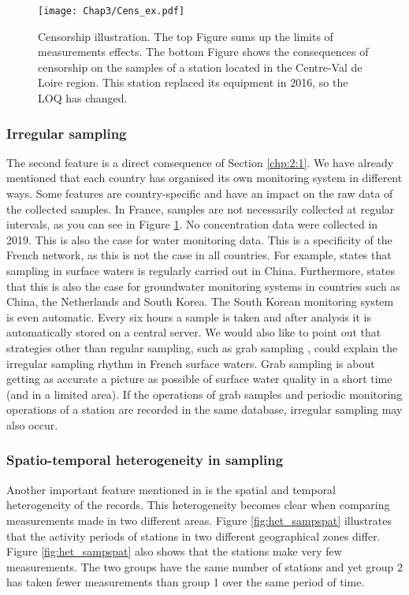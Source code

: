 \begin{figure}
    \centering
    \texttt{[image: Chap3/Cens\_ex.pdf]}
    \caption{Censorship illustration. The top Figure sums up the limits of measurements effects. The bottom Figure shows the consequences of censorship on the samples of a station located in the Centre-Val de Loire region. This station replaced its equipment in 2016, so the LOQ has changed.}
    \label{fig:cens_ex}
\end{figure}

\subsubsection{Irregular sampling}

The second feature is a direct consequence of Section \ref{chp:2:1}. We have already mentioned that each country has organised its own monitoring system in different ways. Some features are country-specific and have an impact on the raw data of the collected samples. In France, samples are not necessarily collected at regular intervals, as you can see in Figure \ref{fig:cens_ex}. No concentration data were collected in 2019. This is also the case for water monitoring data. This is a specificity of the French network, as this is not the case in all countries. For example, \cite{Zhang2008} states that sampling in surface waters is regularly carried out in China. Furthermore, \cite{Joergensen2008} states that this is also the case for groundwater monitoring systems in countries such as China, the Netherlands and South Korea. The South Korean monitoring system is even automatic. Every six hours a sample is taken and after analysis it is automatically stored on a central server. We would also like to point out that strategies other than regular sampling, such as grab sampling \citep{Novic2017}, could explain the irregular sampling rhythm in French surface waters. Grab sampling is about getting as accurate a picture as possible of surface water quality in a short time (and in a limited area). If the operations of grab samples and periodic monitoring operations of a station are recorded in the same database, irregular sampling may also occur.

\subsubsection{Spatio-temporal heterogeneity in sampling}

Another important feature mentioned in \cite{Baran2022} is the spatial and temporal heterogeneity of the records. This heterogeneity becomes clear when comparing measurements made in two different areas. Figure \ref{fig:het_sampspat} illustrates that the activity periods of stations in two different geographical zones differ. Figure \ref{fig:het_sampspat} also shows that the stations make very few measurements. The two groups have the same number of stations and yet group 2 has taken fewer measurements than group 1 over the same period of time.

